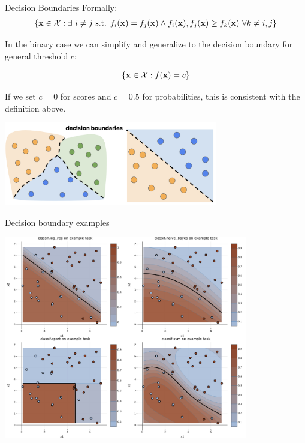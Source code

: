\documentclass[11pt,compress,t,notes=noshow, xcolor=table]{beamer}
\begin{document}
\begin{vbframe}{Decision Boundaries}
Formally:
\begin{eqnarray*}
\{ \xv \in \Xspace: \exists~i \ne j \text{ s.t. } \fkx[i] = \fkx[j] \land \fkx[i], \fkx[j] \ge \fkx[k] ~ \forall k \ne i, j\}
\end{eqnarray*}  
  
In the binary case we can simplify and generalize to the decision boundary for general threshold $c$:

$$
    \{ \xv \in \Xspace : \fx = c \}
$$

If we set $c=0$ for scores and $c=0.5$ for probabilities, this is consistent with the definition above.

\begin{center}
  \includegraphics[width=0.7\textwidth]{figure_man/decision_boundaries.png} 
\end{center}

\end{vbframe}


\begin{vbframe}{Decision boundary examples}

{\centering 
\includegraphics[width=0.80\textwidth]{figure/db_examples.png} 
}

\end{vbframe}
\end{document}
